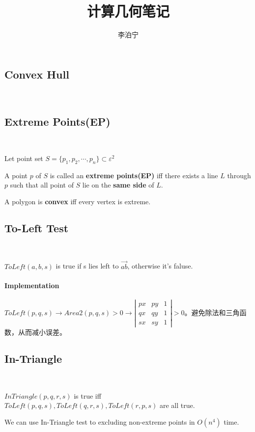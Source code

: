 \documentclass[12pt]{article}
\begin{document}
\begin{CJK*}{GBK}{song}
    \title{计算几何笔记}
    \author{李泊宁}
    \maketitle
    \section{Convex Hull}\
        \subsection{Extreme Points(EP)}\
            \par Let point set $S=\{p_1,p_2,\cdots ,p_n\}\subset \varepsilon^2$
            \par A point $p$ of $S$ is called an \textbf{extreme points(EP)} iff there exists a line $L$ through $p$ such that all point of $S$ lie on the \textbf{same side} of $L$.
            \par A polygon is \textbf{convex} iff every vertex is extreme.
        \subsection{To-Left Test}\
            \par $ToLeft(a,b,s)$ is true if s lies left to $\overrightarrow{ab}$, otherwise it's faluse.
            \paragraph{Implementation}$ToLeft(p,q,s)\to Area2(p,q,s)>0\to \left |\begin{array}{ccc}
                                                                            px & py & 1 \\
                                                                            qx & qy & 1 \\
                                                                            sx & sy & 1
                                                                          \end{array}\right | >0
            $。避免除法和三角函数，从而减小误差。
        \subsection{In-Triangle}\
            \par $InTriangle(p,q,r,s)$ is true iff $ToLeft(p,q,s),ToLeft(q,r,s),ToLeft(r,p,s)$ are all true.
            \par We can use In-Triangle test to excluding non-extreme points in $O(n^4)$ time.

\end{CJK*}
\end{document}
